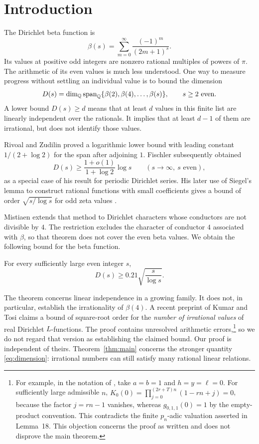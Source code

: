 \section{Introduction}

The Dirichlet beta function is
\[
 \beta(s)=\sum_{m=0}^{\infty}\frac{(-1)^m}{(2m+1)^s}.
\]
Its values at positive odd integers are nonzero rational multiples of
powers of $\pi$. The arithmetic of its even values is much less understood.
One way to measure progress without settling an individual value is to
bound the dimension
\begin{equation}\label{eq:dimension}
 D(s)=\dim_{\mathbb Q}\operatorname{span}_{\mathbb Q}\{\beta(2),\beta(4),\ldots,\beta(s)\},
 \qquad s\geq2\ \text{even}.
\end{equation}
A lower bound $D(s)\geq d$ means that at least $d$ values in this finite
list are linearly independent over the rationals. It implies that at
least $d-1$ of them are irrational, but does not identify those values.

Rivoal and Zudilin \cite[Theorem~1]{RZ03} proved a logarithmic lower bound
with leading constant $1/(2+\log2)$ for the span after adjoining $1$.
Fischler \cite[Theorem~1]{F20} subsequently obtained
\begin{equation}\label{eq:oldbound}
 D(s)\geq\frac{1+o(1)}{1+\log2}\log s
 \qquad(s\longrightarrow\infty,\ s\text{ even}),
\end{equation}
as a special case of his result for periodic Dirichlet series.
His later use of Siegel's lemma to construct rational functions with
small coefficients gives a bound of order $\sqrt{s/\log s}$ for odd
zeta values \cite{F26}.

Mistiaen \cite[Theorem~1.0.5 and Remark~3]{M25} extends that method to
Dirichlet characters whose conductors are not divisible by $4$. The
restriction excludes the character of conductor $4$ associated with
$\beta$, so that theorem does not cover the even beta values.
We obtain the following bound for the beta function.

\begin{theorem}\label{thm:main}
For every sufficiently large even integer $s$,
\[
 D(s)\geq0.21\sqrt{\frac{s}{\log s}}.
\]
\end{theorem}

The theorem concerns linear independence in a growing family. It does
not, in particular, establish the irrationality of $\beta(4)$.
A recent preprint of Kumar and Tosi \cite{KT26} claims a bound of
square-root order for the \emph{number of irrational values} of real
Dirichlet $L$-functions. The proof contains unresolved arithmetic
errors,\footnote{For example, in the notation of \cite[Section~3.3]{KT26},
take $a=b=1$ and $h=y=\ell=0$. For sufficiently large admissible $n$,
$K_0(0)=\prod_{j=0}^{(2r+T)n}(1-rn+j)=0$, because the factor
$j=rn-1$ vanishes, whereas $g_{0,1,1}(0)=1$ by the empty-product
convention. This contradicts the finite $p_n$-adic valuation asserted
in Lemma~18. This objection concerns the proof as written and does not
disprove the main theorem.}
so we do not regard that version as establishing the claimed bound.
Our proof is independent of theirs.
Theorem~\ref{thm:main} concerns the stronger
quantity \eqref{eq:dimension}: irrational numbers can still satisfy many
rational linear relations.


